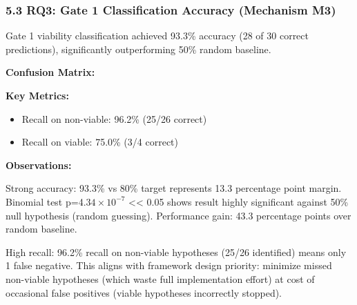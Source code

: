 \subsubsection{5.3 RQ3: Gate 1 Classification Accuracy (Mechanism M3)}

Gate 1 viability classification achieved 93.3\% accuracy (28 of 30 correct predictions), significantly outperforming 50\% random baseline.

\begin{table}[htbp]
\centering
{}
\end{table}

\textbf{Confusion Matrix:}

\begin{table}[htbp]
\centering
{}
\end{table}

\textbf{Key Metrics:}
\begin{itemize}
\item Recall on non-viable: 96.2\% (25/26 correct)
\item Recall on viable: 75.0\% (3/4 correct)
\end{itemize}

\textbf{Observations:}

Strong accuracy: 93.3\% vs 80\% target represents 13.3 percentage point margin. Binomial test p=4.$34\times 10^{-7}$ << 0.05 shows result highly significant against 50\% null hypothesis (random guessing). Performance gain: 43.3 percentage points over random baseline.

High recall: 96.2\% recall on non-viable hypotheses (25/26 identified) means only 1 false negative. This aligns with framework design priority: minimize missed non-viable hypotheses (which waste full implementation effort) at cost of occasional false positives (viable hypotheses incorrectly stopped).

